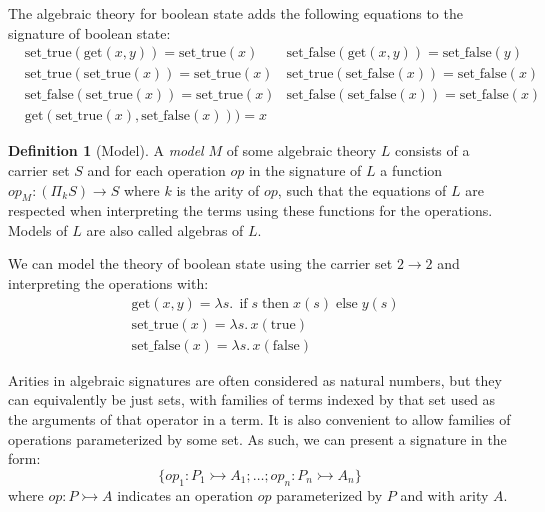 \documentclass[acmsmall, screen, nonacm]{acmart}
\theoremstyle{definition}
\newtheorem{definition}{Definition}[section]
\newcommand{\types}{\mathrel{:}}
\newcommand{\mif}{\mathop{\mathrm{if}}}
\newcommand{\mthen}{\mathop{\mathrm{then}}}
\newcommand{\melse}{\mathop{\mathrm{else}}}
\begin{document}
\begin{example}
  The algebraic theory for boolean state adds the following equations to
  the signature of boolean state:
  \begin{align*}
    &\mathrm{set\_true}(\mathrm{get}(x, y)) = \mathrm{set\_true}(x)
    &\mathrm{set\_false}(\mathrm{get}(x, y)) = \mathrm{set\_false}(y) \\
    &\mathrm{set\_true}(\mathrm{set\_true}(x)) = \mathrm{set\_true}(x)
    &\mathrm{set\_true}(\mathrm{set\_false}(x)) = \mathrm{set\_false}(x) \\
    &\mathrm{set\_false}(\mathrm{set\_true}(x)) = \mathrm{set\_true}(x)
    &\mathrm{set\_false}(\mathrm{set\_false}(x)) = \mathrm{set\_false}(x) \\
    &\mathrm{get}(\mathrm{set\_true}(x), \mathrm{set\_false}(x))) = x
  \end{align*}
\end{example}

\begin{definition}[Model]
  A \emph{model} $M$ of some algebraic theory $L$ consists of a carrier
  set $S$ and for each operation $op$ in the signature of $L$ a function
  $op_M : (\Pi_k S) \rightarrow S$ where $k$ is the arity of $op$, such
  that the equations of $L$ are respected when interpreting the terms
  using these functions for the operations. Models of $L$ are also
  called algebras of $L$.
\end{definition}

\begin{example}
  We can model the theory of boolean state using the carrier set
  $2 \rightarrow 2$ and interpreting the operations with:
  \begin{align*}
    &\mathrm{get}(x, y) = \lambda s.\, \mif s \mthen x(s) \melse y(s) \\
    &\mathrm{set\_true}(x) = \lambda s.\, x(\mathrm{true}) \\
    &\mathrm{set\_false}(x) = \lambda s.\, x(\mathrm{false})
  \end{align*}
\end{example}

Arities in algebraic signatures are often considered as natural numbers,
but they can equivalently be just sets, with families of terms indexed
by that set used as the arguments of that operator in a term. It is also
convenient to allow families of operations parameterized by some set. As
such, we can present a signature in the form:
\begin{equation*}
\{ op_1 \types P_1 \rightarrowtail A_1; \ldots; op_n
\types P_n \rightarrowtail A_n \}
\end{equation*}
where $op \types P \rightarrowtail A$ indicates an operation $op$
parameterized by $P$ and with arity $A$.
\end{document}
